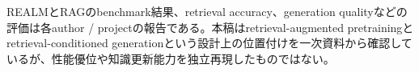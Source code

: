 \begin{claimboundary}
REALMとRAGのbenchmark結果、retrieval accuracy、generation qualityなどの評価は各author / projectの報告である。本稿はretrieval-augmented pretrainingとretrieval-conditioned generationという設計上の位置付けを一次資料から確認しているが、性能優位や知識更新能力を独立再現したものではない。\autocite{src-38c08ba169f1,src-4bf65d8fc7dc,src-c441b6f2b8f4}
\end{claimboundary}
